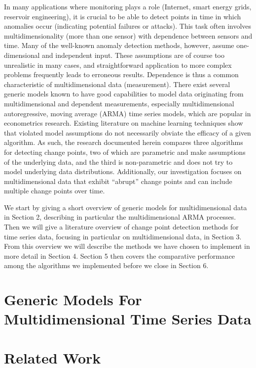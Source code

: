 \documentclass[conference,letterpaper]{IEEEtran}
\begin{document}
In many applications where monitoring plays a role (Internet, smart energy grids, reservoir engineering), it is crucial to be able to detect points in time in which anomalies occur (indicating potential failures or attacks). 
This task often involves multidimensionality (more than one sensor) with dependence between sensors and time.
Many of the well-known anomaly detection methods, however, assume one-dimensional and independent input. 
These assumptions are of course too unrealistic in many cases, and straightforward application to more complex problems frequently leads to erroneous results. 
Dependence is thus a common characteristic of multidimensional data (measurement). 
There exist several generic models known to have good capabilities to model data originating from multidimensional and dependent measurements, especially multidimensional autoregressive, moving average (ARMA) time series models, which are popular in econometrics research.
Existing literature on machine learning techniques show that violated model assumptions do not necessarily obviate the efficacy of a given algorithm.
As such, the research documented herein compares three algorithms for detecting change points, two of which are parametric and make assumptions of the underlying data, and the third is non-parametric and does not try to model underlying data distributions.
Additionally, our investigation focuses on multidimensional data that exhibit ``abrupt'' change points and can include multiple change points over time.

We start by giving a short overview of generic models for multidimensional data in Section 2, describing in particular the multidimensional ARMA processes. 
Then we will give a literature overview of change point detection methods for time series data, focusing in particular on multidimensional data, in Section 3. 
From this overview we will describe the methods we have chosen to implement in more detail in Section 4. 
Section 5 then covers the comparative performance among the algorithms we implemented before we close in Section 6.

\section{Generic Models For Multidimensional Time Series Data}


\section{Related Work}
\end{document}
